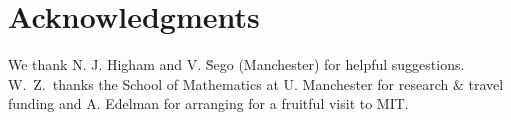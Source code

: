 \documentclass[10pt,conference,compsocconf]{IEEEtran}
\theoremstyle{definition}
\begin{document}
\section*{Acknowledgments}

We thank N. J. Higham and V. \u Sego (Manchester) for helpful suggestions.
W.\ Z.\ thanks the School of Mathematics at U. Manchester for research \& travel funding and
A. Edelman for arranging for a fruitful visit to MIT.




%
%



\end{document}
